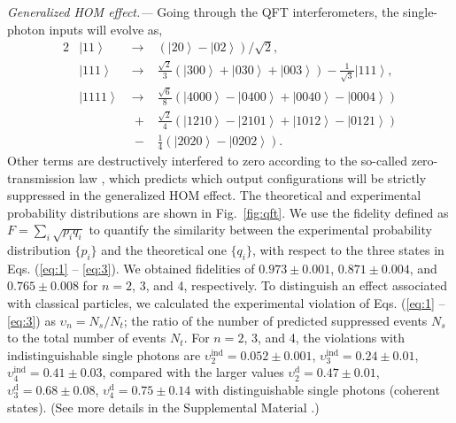 \documentclass[aps,prl,twocolumn,superscriptaddress]{revtex4-1}
\begin{document}
{\em Generalized HOM effect.---} Going through the QFT interferometers, the single-photon inputs will evolve as,
\begin{alignat}{2}
&\left| {11} \right\rangle  \hspace{3pt} &\to \hspace{3pt}& (\left| {20} \right\rangle  - \left| {02} \right\rangle )/\sqrt 2, \label{eq:1}\\
&\left| {111} \right\rangle \hspace{3pt} &\to \hspace{3pt}& \frac{{\sqrt 2 }}{3}(\left| {300} \right\rangle  + \left| {030} \right\rangle  + \left| {003} \right\rangle ) - \frac{1}{{\sqrt 3 }}\left| {111} \right\rangle, \label{eq:2}\\
&\left| {1111} \right\rangle \hspace{3pt} &\to \hspace{3pt}& \frac{{\sqrt 6 }}{8}(\left| {4000} \right\rangle  - \left| {0400} \right\rangle  + \left| {0040} \right\rangle  - \left| {0004} \right\rangle ) \nonumber \\
& &\hspace{3pt} + \hspace{3pt}& \frac{{\sqrt 2 }}{4}(\left| {1210} \right\rangle  - \left| {2101} \right\rangle  + \left| {1012} \right\rangle  - \left| {0121} \right\rangle ) \nonumber\\
& &\hspace{3pt} - \hspace{3pt}& \frac{1}{4}(\left| {2020} \right\rangle  - \left| {0202} \right\rangle \label{eq:3}).
\end{alignat}
Other terms are destructively interfered to zero according to the so-called zero-transmission law \cite{tichy2010}, which predicts which output configurations will be strictly suppressed in the generalized HOM effect. The theoretical and experimental probability distributions are shown in Fig.~\ref{fig:qft}. We use the fidelity defined as $F = \sum\nolimits_i {\sqrt {{p_i}{q_i}} }$ to quantify the similarity between the experimental probability distribution $\{ {p_i}\} $ and the theoretical one $\{ {q_i}\}$, with respect to the three states in Eqs. (\ref{eq:1} -- \ref{eq:3}). We obtained fidelities of $0.973 \pm 0.001$, $ 0.871 \pm 0.004$, and $ 0.765 \pm 0.008$ for $n = 2$, 3, and 4, respectively. To distinguish an effect associated with classical particles, we calculated the experimental violation of Eqs. (\ref{eq:1} -- \ref{eq:3}) as ${\upsilon_n}  = {N_s}/{N_t}$; the ratio of the number of predicted suppressed events ${N_s}$ to the total number of events ${N_t}$. For $n = 2$, 3, and 4, the violations with indistinguishable single photons are $\upsilon _2^{{\mbox{ind}}} = 0.052 \pm 0.001$, $\upsilon _3^{{\mbox{ind}}} = 0.24 \pm 0.01$, $\upsilon _4^{{\mbox{ind}}} = 0.41 \pm 0.03$, compared with the larger values $\upsilon _2^{\mbox{d}} = 0.47 \pm 0.01$, $\upsilon _3^{\mbox{d}} = 0.68 \pm 0.08$, $\upsilon _4^{\mbox{d}} = 0.75 \pm 0.14$ with distinguishable single photons (coherent states). (See more details in the Supplemental Material \cite{SUPPLEMENTALMATERIAL}.)
\end{document}
